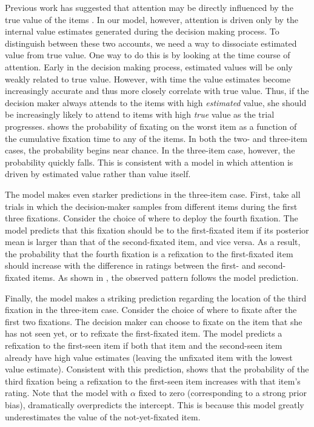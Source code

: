 Previous work has suggested that attention may be directly influenced by the true value of the items \citep{towal2013simultaneous,anderson2016attention,gluth2018valuebaseda}. In our model, however, attention is driven only by the internal value estimates generated during the decision making process. To distinguish between these two accounts, we need a way to dissociate estimated value from true value. One way to do this is by looking at the time course of attention. Early in the decision making process, estimated values will be only weakly related to true value. However, with time the value estimates become increasingly accurate and thus more closely correlate with true value. Thus, if the decision maker always attends to the items with high \emph{estimated} value, she should be increasingly likely to attend to items with high \emph{true} value as the trial progresses.  shows the probability of fixating on the worst item as a function of the cumulative fixation time to any of the items. In both the two- and three-item cases, the probability begins near chance. In the three-item case, however, the probability quickly falls. This is consistent with a model in which attention is driven by estimated value rather than value itself.

The model makes even starker predictions in the three-item case. First, take all trials in which the decision-maker samples from different items during the first three fixations. Consider the choice of where to deploy the fourth fixation. The model predicts that this fixation should be to the first-fixated item if its posterior mean is larger than that of the second-fixated item, and vice versa. As a result, the probability that the fourth fixation is a refixation to the first-fixated item should increase with the difference in ratings between the first- and second-fixated items. As shown in , the observed pattern follows the model prediction. 

Finally, the model makes a striking prediction regarding the location of the third fixation in the three-item case. Consider the choice of where to fixate after the first two fixations. The decision maker can choose to fixate on the item that she has not seen yet, or to refixate the first-fixated item. The model predicts a refixation to the first-seen item if both that item and the second-seen item already have high value estimates (leaving the unfixated item with the lowest value estimate). Consistent with this prediction,  shows that the probability of the third fixation being a refixation to the first-seen item increases with that item's rating. Note that the model with $\alpha$ fixed to zero (corresponding to a strong prior bias), dramatically overpredicts the intercept. This is because this model greatly underestimates the value of the not-yet-fixated item.


